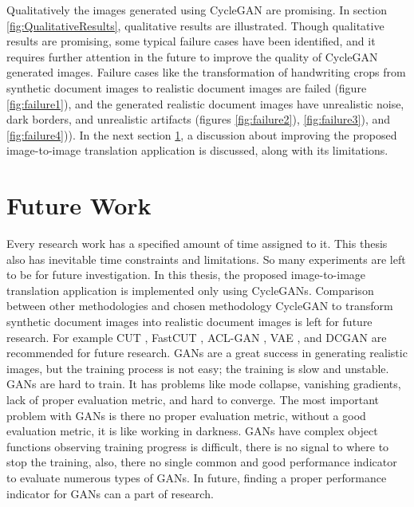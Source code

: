 Qualitatively the images generated using \ac{CycleGAN} are promising. In section \ref{fig:QualitativeResults}, qualitative results are illustrated. Though qualitative results are promising, some typical failure cases have been identified, and it requires further attention in the future to improve the quality of \ac{CycleGAN} generated images. Failure cases like the transformation of handwriting crops from synthetic document images to realistic document images are failed (figure \ref{fig:failure1}), and the generated realistic document images have unrealistic noise, dark borders, and unrealistic artifacts (figures \ref{fig:failure2}), \ref{fig:failure3}), and \ref{fig:failure4})). In the next section \ref{FutureWork}, a discussion about improving the proposed image-to-image translation application is discussed, along with its limitations.





\section{Future Work}\label{FutureWork}

Every research work has a specified amount of time assigned to it. This thesis also has inevitable time constraints and limitations. So many experiments are left to be for future investigation. In this thesis, the proposed image-to-image translation application is implemented only using \acp{CycleGAN}. Comparison between other methodologies and chosen methodology \ac{CycleGAN} to transform synthetic document images into realistic document images is left for future research. For example \ac{CUT} \cite{park2020contrastive}, \ac{FastCUT} \cite{park2020contrastive}, \ac{ACL-GAN} \cite{zhao2021unpaired}, \ac{VAE} \cite{Kingma_2019}, and \ac{DCGAN} \cite{radford2016unsupervised} are recommended for future research. \acp{GAN} are a great success in generating realistic images, but the training process is not easy; the training is slow and unstable. \acp{GAN} are hard to train. It has problems like mode collapse, vanishing gradients, lack of proper evaluation metric, and hard to converge. The most important problem with \acp{GAN} is there no proper evaluation metric, without a good evaluation metric, it is like working in darkness. \acp{GAN} have complex object functions observing training progress is difficult, there is no signal to where to stop the training, also, there no single common and good performance indicator to evaluate numerous types of \acp{GAN}. In future, finding a proper performance indicator for \acp{GAN} can a part of research. 


